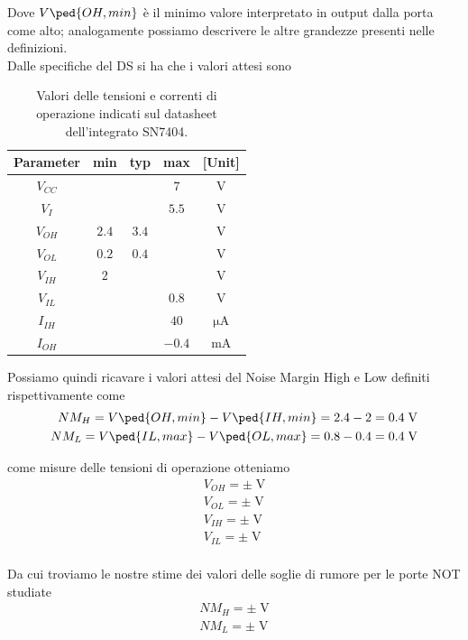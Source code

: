 \documentclass[10pt, a4paper, italian]{article}
\begin{document}
Dove $V\ped{OH, min}$ è il minimo valore interpretato in output dalla porta come alto; analogamente possiamo descrivere le altre grandezze presenti nelle definizioni.\\
Dalle specifiche del DS si ha che i valori attesi sono
\begin{table}[htb]
\centering
\begin{tabular}{cccc|c}
\toprule
Parameter  & min & typ & max & [Unit] \\
\midrule
\midrule
$V_{CC}$ &  &  & $7$ & V \\
$V_I$	 &  &  & $5.5$ & V\\
$V_{OH}$ & $2.4$  & $3.4$ & & V \\
$V_{OL}$ & $0.2$  & $0.4$ & & V \\
$V_{IH}$ & $2$  &  & & V  \\
$V_{IL}$ &  &  & $0.8$ & V \\
$I_{IH}$ &  &  & $40$ & $\si{\micro\A}$ \\
$I_{OH}$ &  &  & $-0.4$ & mA \\
\bottomrule 
\end{tabular}

\caption{Valori delle tensioni e correnti di operazione indicati sul
datasheet dell'integrato SN7404.}
\label{tab: notDS}
\end{table}
Possiamo quindi ricavare i valori attesi del Noise Margin High e Low
definiti rispettivamente come
\begin{align*}
    NM_H = V\ped{OH, min} - V\ped{IH, min} = 2.4 - 2 = 0.4 \; \si{\V} \\
    NM_L = V\ped{IL, max} - V\ped{OL, max} = 0.8 - 0.4 = 0.4 \; \si{\V}
\end{align*}

come misure delle tensioni di operazione otteniamo
\begin{align*}
V_{OH} = \pm \; \si{\V} \\
V_{OL}= \pm \; \si{\V} \\
V_{IH} = \pm \; \si{\V} \\
V_{IL} = \pm \; \si{\V} \\
\end{align*}

Da cui troviamo le nostre stime dei valori delle soglie di rumore per le porte
NOT studiate
\begin{align*}
NM_H = \pm \; \si{\V} \\
NM_L = \pm \; \si{\V}
\end{align*}
\end{document}
